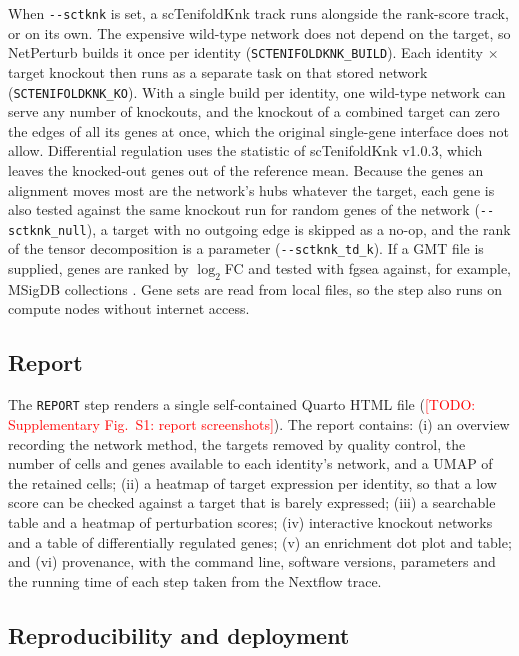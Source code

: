\documentclass[unnumsec,webpdf,contemporary,large]{oup-authoring-template}
\newcommand{\todo}[1]{\textcolor{red}{[TODO: #1]}}
\newcommand{\param}[1]{\texttt{-{}-#1}}
\begin{document}
When \param{sctknk} is set, a scTenifoldKnk track \citep{Osorio2022sctenifoldknk} runs alongside the rank-score track, or on its own. The expensive wild-type network does not depend on the target, so NetPerturb builds it once per identity (\texttt{SCTENIFOLDKNK\_BUILD}). Each identity $\times$ target knockout then runs as a separate task on that stored network (\texttt{SCTENIFOLDKNK\_KO}). With a single build per identity, one wild-type network can serve any number of knockouts, and the knockout of a combined target can zero the edges of all its genes at once, which the original single-gene interface does not allow. Differential regulation uses the statistic of scTenifoldKnk v1.0.3, which leaves the knocked-out genes out of the reference mean. Because the genes an alignment moves most are the network's hubs whatever the target, each gene is also tested against the same knockout run for random genes of the network (\param{sctknk\_null}), a target with no outgoing edge is skipped as a no-op, and the rank of the tensor decomposition is a parameter (\param{sctknk\_td\_k}). If a GMT file is supplied, genes are ranked by $\log_2$FC and tested with fgsea \citep{Korotkevich2016fgsea} against, for example, MSigDB collections \citep{Liberzon2015msigdb}. Gene sets are read from local files, so the step also runs on compute nodes without internet access.

\subsection{Report}

The \texttt{REPORT} step renders a single self-contained Quarto HTML file (\todo{Supplementary Fig.~S1: report screenshots}). The report contains:
(i) an overview recording the network method, the targets removed by quality control, the number of cells and genes available to each identity's network, and a UMAP of the retained cells;
(ii) a heatmap of target expression per identity, so that a low score can be checked against a target that is barely expressed;
(iii) a searchable table and a heatmap of perturbation scores;
(iv) interactive knockout networks and a table of differentially regulated genes;
(v) an enrichment dot plot and table; and
(vi) provenance, with the command line, software versions, parameters and the running time of each step taken from the Nextflow trace.

\subsection{Reproducibility and deployment}
\end{document}
